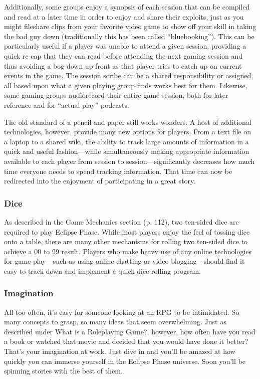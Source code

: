 Additionally, some groups enjoy a synopsis of each session that can be compiled and read at a later time in order to enjoy and share their exploits, just as you might fileshare clips from your favorite video game to show off your skill in taking the bad guy down (traditionally this has been called ``bluebooking''). This can be particularly useful if a player was unable to attend a given session, providing a quick re-cap that they can read before attending the next gaming session and thus avoiding a bog-down up-front as that player tries to catch up on current events in the game. The session scribe can be a shared responsibility or assigned, all based upon what a given playing group finds works best for them. Likewise, some gaming groups audiorecord their entire game session, both for later reference and for ``actual play'' podcasts. 

The old standard of a pencil and paper still works wonders. A host of additional technologies, however, provide many new options for players. From a text file on a laptop to a shared wiki, the ability to track large amounts of information in a quick and useful fashion—while simultaneously making appropriate information available to each player from session to session—significantly decreases how much time everyone needs to spend tracking information. That time can now be redirected into the enjoyment of participating in a great story. 



\subsubsection{Dice} \label{sec:dice} 

As described in the Game Mechanics section (p. 112), two ten-sided dice are required to play Eclipse Phase. While most players enjoy the feel of tossing dice onto a table, there are many other mechanisms for rolling two ten-sided dice to achieve a 00 to 99 result. Players who make heavy use of any online technologies for game play—such as using online chatting or video blogging—should find it easy to track down and implement a quick dice-rolling program. 



\subsubsection{Imagination} \label{sec:imagination} 

All too often, it's easy for someone looking at an RPG to be intimidated. So many concepts to grasp, so many ideas that seem overwhelming. Just as described under What is a Roleplaying Game?, however, how often have you read a book or watched that movie and decided that you would have done it better? That's your imagination at work. Just dive in and you'll be amazed at how quickly you can immerse yourself in the Eclipse Phase universe. Soon you'll be spinning stories with the best of them. 

